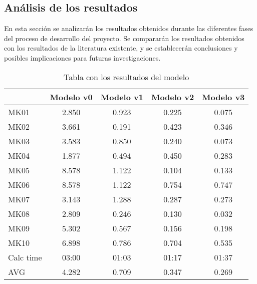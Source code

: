 \subsection{Análisis de los resultados}
En esta sección se analizarán los resultados obtenidos durante las diferentes
fases del proceso de desarrollo del proyecto. Se compararán los resultados
obtenidos con los resultados de la literatura existente, y se establecerán
conclusiones y posibles implicaciones para futuras investigaciones.

\begin{table}[ht]
    \centering
    \begin{tabular}[ht]{|l|cccc|}
        \hline
                  & Modelo v0 & Modelo v1 & Modelo v2 & Modelo v3 \\
        \hline
        MK01      & 2.850    & 0.923    & 0.225    & 0.075    \\
        MK02      & 3.661    & 0.191    & 0.423    & 0.346    \\
        MK03      & 3.583    & 0.850    & 0.240    & 0.073    \\
        MK04      & 1.877    & 0.494    & 0.450    & 0.283    \\
        MK05      & 8.578    & 1.122    & 0.104    & 0.133    \\
        MK06      & 8.578    & 1.122    & 0.754    & 0.747    \\
        MK07      & 3.143    & 1.288    & 0.287    & 0.273    \\
        MK08      & 2.809    & 0.246    & 0.130    & 0.032    \\
        MK09      & 5.302    & 0.567    & 0.156    & 0.198    \\
        MK10      & 6.898    & 0.786    & 0.704    & 0.535    \\
        \hline
        Calc time & 03:00    & 01:03    & 01:17    & 01:37    \\
        AVG       & 4.282    & 0.709    & 0.347    & 0.269    \\
        \hline
    \end{tabular}
    \caption{Tabla con los resultados del modelo}
\end{table}

